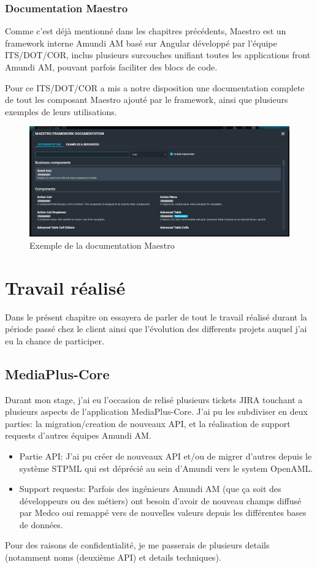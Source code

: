 \subsection{Documentation Maestro}
\par Comme c'est déjà mentionné dans les chapitres précédents, Maestro est un framework interne Amundi AM basé sur Angular développé par l'équipe ITS/DOT/COR, inclus plusieurs surcouches unifiant toutes les applications front Amundi AM, pouvant parfois faciliter des blocs de code.
\par Pour ce ITS/DOT/COR a mis a notre disposition une documentation complete de tout les composant Maestro ajouté par le framework, ainsi que plusieurs exemples de leurs utilisations.
\begin{figure}[ht]
    \centering
    \includegraphics[width=\columnwidth]{img/maestrodocum.png}
    \caption{Exemple de la documentation Maestro}
\end{figure} 

\chapter{Travail réalisé}
\par Dans le présent chapitre on essayera de parler de tout le travail réalisé durant la période passé chez le client ainsi que l'évolution des differents projets auquel j'ai eu la chance de participer.
\section{MediaPlus-Core}
\par Durant mon stage, j'ai eu l'occasion de relisé plusieurs tickets JIRA touchant a plusieurs aspects de l'application MediaPlus-Core. J'ai pu les subdiviser en deux parties: la migration/creation de nouveaux API, et la réalisation de support requests d'autres équipes Amundi AM.
\begin{itemize}
    \item Partie API: J'ai pu créer de nouveaux API et/ou de migrer d'autres depuis le système STPML qui est déprécié au sein d'Amundi vers le system OpenAML.
    \item Support requests: Parfois des ingénieurs Amundi AM (que ça soit des développeurs ou des métiers) ont besoin d'avoir de nouveau champs diffusé par Medco oui remappé vers de nouvelles valeurs depuis les différentes bases de données. 
\end{itemize} 
\par Pour des raisons de confidentialité, je me passerais de plusieurs details (notamment noms (deuxième API) et details techniques).
